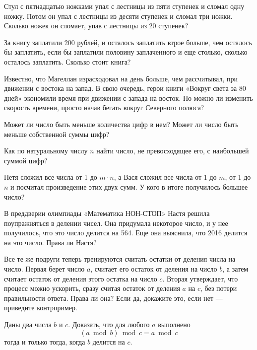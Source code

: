 ﻿%
\begin{itemize}
\itA Стул с пятнадцатью ножками упал с лестницы из пяти ступенек и сломал одну ножку. Потом он упал с лестницы из десяти ступенек и сломал три ножки. Сколько ножек он сломает, упав с лестницы из 20 ступенек?

\itB За книгу заплатили 200 рублей, и осталось заплатить втрое больше, чем осталось бы заплатить, если бы заплатили половину заплаченного и еще столько, сколько осталось заплатить. Сколько стоит книга?

\itC Известно, что Магеллан израсходовал на день больше, чем рассчитывал, при движении с востока на запад. В свою очередь, герои книги «Вокруг света за 80 дней» экономили время при движении с запада на восток. Но можно ли изменить скорость времени, просто начав бегать вокруг Северного полюса?
\end{itemize}

\begin{itemize}
\itA Может ли число быть меньше количества цифр в нем? Может ли число быть меньше собственной суммы цифр?

\itB Как по натуральному числу $n$ найти число, не превосходящее его, с наибольшей суммой цифр?

\itC Петя сложил все числа от 1 до $m \cdot n$, а Вася сложил все числа от 1 до $m$, от 1 до $n$ и посчитал произведение этих двух сумм. У кого в итоге получилось большее число?
\end{itemize}

\begin{itemize}
\itA В преддверии олимпиады «Математика НОН-СТОП» Настя решила поупражняться в делении чисел. Она придумала некоторое число, и у нее получилось, что это число делится на 564. Еще она выяснила, что 2016 делится на это число. Права ли Настя?

\itB Все те же подруги теперь тренируются считать остатки от деления числа на число. Первая берет число $a$, считает его остаток от деления на число $b$, а затем считает остаток от деления этого остатка на число $c$. Вторая утверждает, что процесс можно ускорить, сразу считая остаток от деления $a$ на $c$, без потери правильности ответа. Права ли она? Если да, докажите это, если нет — приведите контрпример.

\itC Даны два числа $b$ и $c$. Доказать, что для любого $a$ выполнено
	$$(a \bmod b) \bmod c = a \bmod c$$
тогда и только тогда, когда $b$ делится на $c$.
\end{itemize}


